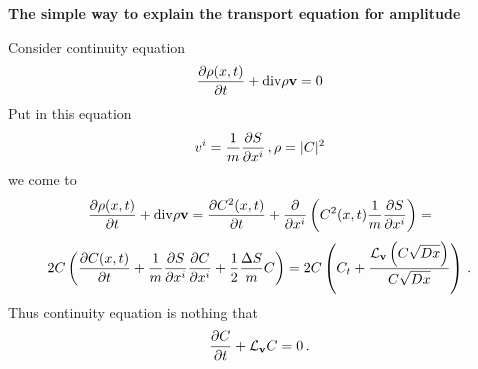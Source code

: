 

\baselineskip=14pt
\def\vare {\varepsilon}
\def\A {{\bf A}}
\def\t {\tilde}
\def\a {\alpha}
\def\K {{\bf K}}
\def\N {{\bf N}}
\def\V {{\cal V}}
\def\s {{\sigma}}
\def\S {{\Sigma}}
\def\s {{\sigma}}
\def\p{\partial}
\def\vare{{\varepsilon}}
\def\Q {{\bf Q}}
\def\D {{\cal D}}
\def\G {{\Gamma}}
\def\C {{\bf C}}
\def\M {{\cal M}}
\def\Z {{\bf Z}}
\def\U  {{\cal U}}
\def\H {{\cal H}}
\def\R  {{\bf R}}
\def\S  {{\bf S}}
\def\E  {{\bf E}}
\def\l {\lambda}
\def\ll {{\bf l}}
\def\degree {{\bf {\rm degree}\,\,}}
\def \finish {${\,\,\vrule height1mm depth2mm width 8pt}$}
\def \m {\medskip}
\def\p {\partial}
\def\r {{\bf r}}
\def\pt {{\bf p}}
\def\v {{\bf v}}
\def\n {{\bf n}}
\def\t {{\bf t}}
\def\b {{\bf b}}
\def\c {{\bf c }}
\def\e{{\bf e}}
\def\ac {{\bf a}}
\def \X   {{\bf X}}
\def \Y   {{\bf Y}}
\def \x   {{\bf x}}
\def \y   {{\bf y}}
\def \G{{\cal G}}
\def\w {{\omega}}
\def \Tr  {{\rm Tr\,}}
\def\V {{\cal V}}

    \centerline {\bf The simple way to explain the transport equation for
  amplitude}

Consider continuity equation
       $$
{\p \rho(x,t)\over \p t}+ {\rm div }\rho{\bf v}=0
       $$
Put in this equation
       $$
v^i={1\over m}{\p S\over \p x^i}\,,
\rho =|C|^2
       $$
we come to
          $$
{\p \rho(x,t)\over \p t}+ {\rm div }\rho{\bf v}=
{\p C^2(x,t)\over \p t}+ 
      {\p\over \p x^i}
     \left(
          C^2(x,t)
           {1\over m}
              {\p S\over \p x^i}
      \right)=
          $$
        $$
2C
  \left(
   {\p C(x,t)\over \p t}+
{1\over m}{\p S\over \p x^i}
{\p C\over \p x^i}+
      {1\over 2} 
       {\Delta S\over m}C     
    \right)=
   2C
 \left(
    C_t+{
    {\cal L}_{\bf v} \left(C\sqrt {Dx}\right)
  \over C\sqrt {Dx}}
   \right)\,.
        $$
Thus continuity equation is nothing that
           $$
{\p C\over \p t}+{\cal L}_\v C=0\,.
         $$
\bye
